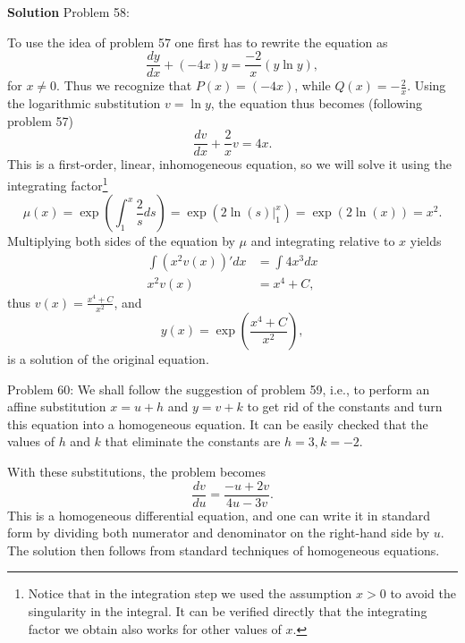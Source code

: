 \documentclass[12pt,oneside]{exam}
\newenvironment{newsolution}{\vspace{.1in}\noindent\textbf{Solution \hspace{.05em}}}{}
\begin{document}
\begin{newsolution}
Problem 58:

To use the idea of problem 57 one first has to rewrite the equation as 
\begin{equation*}
\frac{dy}{dx} + (-4x)y = \frac{-2}{x}(y \ln y),  
\end{equation*}
for $x \neq 0$.
Thus we recognize that $P(x)=(-4x)$, while $Q(x)=-\frac{2}{x}$. Using the logarithmic substitution $v = \ln y$, the equation thus becomes (following problem 57)
\begin{equation*}
\frac{dv}{dx}  + \frac{2}{x}v = 4x.
\end{equation*}
This is a first-order, linear, inhomogeneous equation, so we will solve it using the integrating factor\footnote{Notice that in the integration step we used the assumption $x>0$ to avoid the singularity in the integral. It can be verified directly that the integrating factor we obtain also works for other values of $x$.}
\begin{equation*}
\mu(x)= \exp\left(\int_{1}^{x} \frac{2}{s} ds \right) = \exp\left(2\ln(s) \Big|_{1}^{x}\right) = \exp\left(2\ln(x)\right) = x^2.
\end{equation*}
Multiplying both sides of the equation by $\mu$ and integrating relative to $x$ yields
\begin{align*}
\int (x^2v(x))' dx & = \int 4x^3 dx \\
x^2v(x) & = x^4 + C, 
\end{align*}
thus $v(x)=\frac{x^4 +C}{x^2}$, and 
\begin{equation*}
y(x)=\exp\left(\frac{x^4+C}{x^2}\right), 
\end{equation*}
is a solution of the original equation.

Problem 60: We shall follow the suggestion of problem 59, i.e., to perform an affine substitution $x=u+h$ and $y=v+k$ to get rid of the constants and turn this equation into a homogeneous equation. It can be easily checked that the values of $h$ and $k$ that eliminate the constants are $h=3, k= -2$.  

With these substitutions, the problem becomes
\begin{equation*}
\frac{dv}{du}=\frac{-u+2v}{4u-3v}.
\end{equation*}
This is a homogeneous differential equation, and one can write it in standard form by dividing both numerator and denominator on the right-hand side by $u$. The solution then follows from standard techniques of homogeneous equations.  


\end{newsolution}
\end{document}

